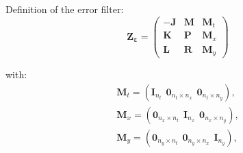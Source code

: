 \addtocounter{framenumber}{-1}
\begin{frame}
	Definition of the error filter:
		\begin{equation} \label{zepsmatrix}
		\boldsymbol{Z_\varepsilon}=
					\begin{pmatrix}
						\boldsymbol{-J} & \boldsymbol{M} & \boldsymbol{M}_t \\
						\boldsymbol{K} & \boldsymbol{P} & \boldsymbol{M}_x \\
						\boldsymbol{L} & \boldsymbol{R} & \boldsymbol{M}_y 
					\end{pmatrix}
		\end{equation}

		with:
		\begin{eqnarray} \label{deltaerr}
			\boldsymbol{M}_t=(\boldsymbol{I}_{n_t} \hspace{5pt} \boldsymbol{0}_{n_t \times n_x} \hspace{5pt} \boldsymbol{0}_{n_t \times n_y}), \\
			\boldsymbol{M}_x=(\boldsymbol{0}_{n_x \times n_t} \hspace{5pt} \boldsymbol{I}_{n_x} \hspace{5pt} \boldsymbol{0}_{n_x \times n_y}), \\
			\boldsymbol{M}_y=(\boldsymbol{0}_{n_y \times n_t} \hspace{5pt} \boldsymbol{0}_{n_y \times n_x} \hspace{5pt} \boldsymbol{I}_{n_y}),
		\end{eqnarray}
\end{frame}

